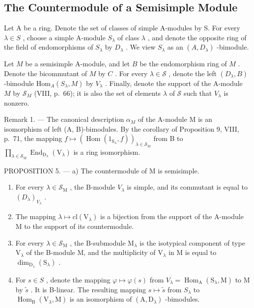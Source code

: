\subsection{The Countermodule of a Semisimple Module}

Let A be a ring. Denote the set of classes of simple A-modules by S. For every \(\lambda \in S\) , choose a simple A-module \(S_{\lambda}\) of class \(\lambda\) , and denote the opposite ring of the field of endomorphisms of \(S_{\lambda}\) by \(D_{\lambda}\) . We view \(S_{\lambda}\) as an \((A, D_{\lambda})\) -bimodule.

Let \(M\) be a semisimple A-module, and let \(B\) be the endomorphism ring of \(M\) . Denote the bicommutant of \(M\) by \(C\) . For every \(\lambda \in \mathcal{S}\) , denote the left \((D_{\lambda}, B)\) -bimodule \(\mathrm{Hom}_A(S_{\lambda}, M)\) by \(V_{\lambda}\) . Finally, denote the support of the A-module \(M\) by \(\mathcal{S}_M\) (VIII, p.~66); it is also the set of elements \(\lambda\) of \(\mathcal{S}\) such that \(V_{\lambda}\) is nonzero.

Remark 1. --- The canonical description \(\alpha_{M}\) of the A-module M is an isomorphism of left (A, B)-bimodules. By the corollary of Proposition 9, VIII, p.~71, the mapping \(f \mapsto (\operatorname{Hom}(1_{\mathrm{S}_{\lambda}}, f))_{\lambda \in \mathcal{S}_{\mathrm{M}}}\) from B to \(\prod_{\lambda \in \mathcal{S}_{\mathrm{M}}} \operatorname{End}_{\mathrm{D}_{\lambda}}(\mathrm{V}_{\lambda})\) is a ring isomorphism.

PROPOSITION 5. --- a) The countermodule of M is semisimple.

\begin{enumerate}
\def\labelenumi{\alph{enumi})}
\setcounter{enumi}{1}
\item
  For every \(\lambda \in \mathcal{S}_{\mathrm{M}}\) , the B-module \(V_{\lambda}\) is simple, and its commutant is equal to \((D_{\lambda})_{V_{\lambda}}\) .
\item
  The mapping \(\lambda \mapsto \mathrm{cl}(\mathrm{V}_{\lambda})\) is a bijection from the support of the A-module M to the support of its countermodule.
\item
  For every \(\lambda \in \mathcal{S}_{\mathrm{M}}\) , the B-submodule \(\mathrm{M}_{\lambda}\) is the isotypical component of type \(\mathrm{V}_{\lambda}\) of the B-module M, and the multiplicity of \(\mathrm{V}_{\lambda}\) in M is equal to \(\dim_{\mathrm{D}_{\lambda}}(\mathrm{S}_{\lambda})\) .
\item
  For \(s \in S\) , denote the mapping \(\varphi \mapsto \varphi(s)\) from \(V_{\lambda} = \operatorname{Hom}_{\mathrm{A}}(\mathrm{S}_{\lambda}, \mathrm{M})\) to M by \(\widetilde{s}\) . It is B-linear. The resulting mapping \(s \mapsto \widetilde{s}\) from \(S_{\lambda}\) to \(\operatorname{Hom}_{\mathrm{B}}(\mathrm{V}_{\lambda}, \mathrm{M})\) is an isomorphism of \((\mathrm{A}, \mathrm{D}_{\lambda})\) -bimodules.
\end{enumerate}

